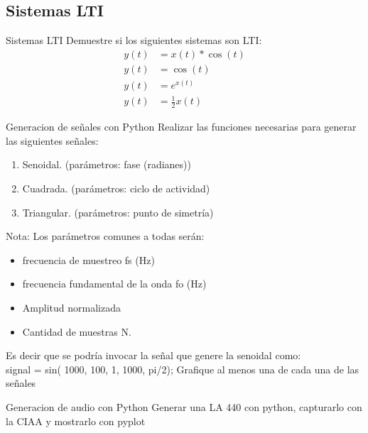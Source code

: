  \subsection{Sistemas LTI}
 \begin{frame}{Sistemas LTI}
 Demuestre si los siguientes sistemas son LTI:\\
 \begin{align*}
    y(t) &= x(t)*\cos{(t)} \\
    y(t) &= \cos(t) \\
    y(t) &= e^{x(t)} \\
    y(t) &= \frac{1}{2}x(t)
 \end{align*}
    \vfill
 \end{frame}
 \begin{frame}{Generacion de señales con Python}
    Realizar las funciones necesarias para generar las siguientes señales:
    \begin{enumerate}
       \item {Senoidal. (parámetros: fase (radianes))}
       \item {Cuadrada. (parámetros: ciclo de actividad)}
       \item {Triangular. (parámetros: punto de simetría)}
    \end{enumerate}
    Nota: Los parámetros comunes a todas serán:
    \begin{itemize}
       \item {frecuencia de muestreo fs (Hz) }
       \item {frecuencia fundamental de la onda fo (Hz) }
       \item {Amplitud normalizada }
       \item {Cantidad de muestras N. }
    \end{itemize}
        Es decir que se podría invocar la señal que genere la senoidal como: \\
        signal = sin( 1000, 100, 1, 1000, pi/2);
        Grafique al menos una de cada una de las señales
    \vfill
 \end{frame}
 \begin{frame}{Generacion de audio con Python}
   Generar una LA 440 con python, capturarlo con la CIAA y mostrarlo con pyplot
 \end{frame}
